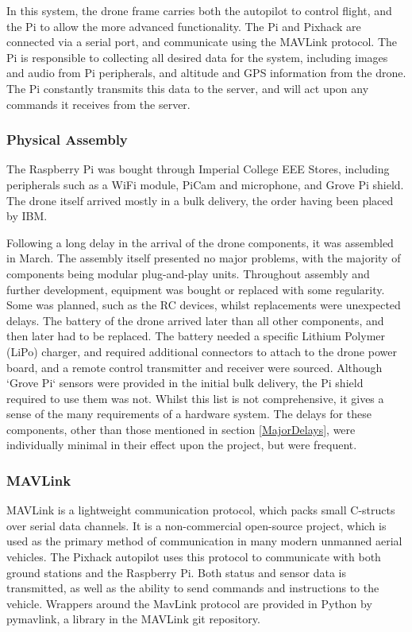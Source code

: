 \documentclass{article}
\begin{document}
In this system, the drone frame carries both the autopilot to control flight, and the Pi to allow the more advanced functionality. The Pi and Pixhack are connected via a serial port, and communicate using the MAVLink protocol. The Pi is responsible to collecting all desired data for the system, including images and audio from Pi peripherals, and altitude and GPS information from the drone. The Pi constantly transmits this data to the server, and will act upon any commands it receives from the server.

\subsubsection{Physical Assembly}
The Raspberry Pi was bought through Imperial College EEE Stores, including peripherals such as a WiFi module, PiCam and microphone, and Grove Pi shield. The drone itself arrived mostly in a bulk delivery, the order having been placed by IBM. 

Following a long delay in the arrival of the drone components, it was assembled in March. The assembly itself presented no major problems, with the majority of components being modular plug-and-play units. Throughout assembly and further development, equipment was bought or replaced with some regularity. Some was planned, such as the RC devices, whilst replacements were unexpected delays. The battery of the drone arrived later than all other components, and then later had to be replaced. The battery needed a specific Lithium Polymer (LiPo) charger, and required additional connectors to attach to the drone power board, and a remote control transmitter and receiver were sourced. Although `Grove Pi` sensors were provided in the initial bulk delivery, the Pi shield required to use them was not. Whilst this list is not comprehensive, it gives a sense of the many requirements of a hardware system. The delays for these components, other than those mentioned in section \ref{MajorDelays}, were individually minimal in their effect upon the project, but were frequent. 

\subsubsection{MAVLink}
MAVLink is a lightweight communication protocol, which packs small C-structs over serial data channels\cite{qGroundMavlink}. It is a non-commercial open-source project, which is used as the primary method of communication in many modern unmanned aerial vehicles. The Pixhack autopilot uses this protocol to communicate with both ground stations and the Raspberry Pi. Both status and sensor data is transmitted, as well as the ability to send commands and instructions to the vehicle. Wrappers around the MavLink protocol are provided in Python by pymavlink, a library in the MAVLink git repository.
\end{document}
